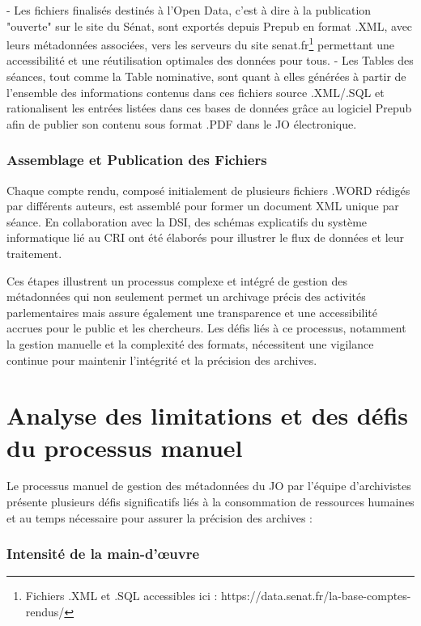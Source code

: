 - Les fichiers finalisés destinés à l'Open Data, c'est à dire à la publication "ouverte" sur le site du Sénat, sont exportés depuis \gls{Prepub} en format .\gls{XML}, avec leurs métadonnées associées, vers les serveurs du site senat.fr\footnote{Fichiers .\gls{XML} et .\gls{SQL} accessibles ici : https://data.senat.fr/la-base-comptes-rendus/} permettant une accessibilité et une réutilisation optimales des données pour tous. 
- Les Tables des séances, tout comme la Table nominative, sont quant à elles générées à partir de l'ensemble des informations contenus dans ces fichiers source .\gls{XML}/.\gls{SQL} et rationalisent les entrées listées dans ces bases de données grâce au logiciel \gls{Prepub} afin de publier son contenu sous format .\gls{PDF} dans le JO électronique.

\subsubsection{Assemblage et Publication des Fichiers}

Chaque compte rendu, composé initialement de plusieurs fichiers .WORD rédigés par différents auteurs, est assemblé pour former un document \gls{XML} unique par séance. En collaboration avec la DSI, des schémas explicatifs du système informatique lié au CRI ont été élaborés pour illustrer le flux de données et leur traitement.

Ces étapes illustrent un processus complexe et intégré de gestion des métadonnées qui non seulement permet un archivage précis des activités parlementaires mais assure également une transparence et une accessibilité accrues pour le public et les chercheurs. Les défis liés à ce processus, notamment la gestion manuelle et la complexité des formats, nécessitent une vigilance continue pour maintenir l'intégrité et la précision des archives.
\section{Analyse des limitations et des défis du processus manuel}

Le processus manuel de gestion des métadonnées du \gls{JO} par l'équipe d'archivistes présente plusieurs défis significatifs liés à la consommation de ressources humaines et au temps nécessaire pour assurer la précision des archives :

\subsubsection{Intensité de la main-d'œuvre}

